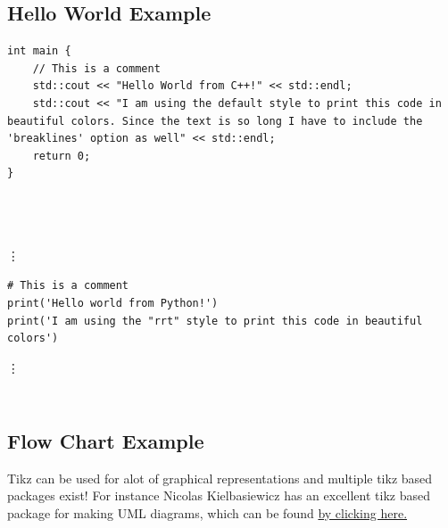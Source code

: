 \subsection{Hello World Example}\label{appendix_A}

\begin{verbatim}
int main {
    // This is a comment
    std::cout << "Hello World from C++!" << std::endl;
    std::cout << "I am using the default style to print this code in beautiful colors. Since the text is so long I have to include the 'breaklines' option as well" << std::endl;
    return 0;
}


 
\end{verbatim}

\vdots

\begin{verbatim}
# This is a comment
print('Hello world from Python!')
print('I am using the "rrt" style to print this code in beautiful colors')
\end{verbatim}

\vdots

\inputminted[breaklines]{Python}{./Code/main.py}


\inputminted[breaklines]{Matlab}{./Code/HelloWorld.m}

\newpage
\subsection{Flow Chart Example}

Tikz can be used for alot of graphical representations and multiple tikz based packages exist! For instance Nicolas Kielbasiewicz has an excellent tikz based package for making UML diagrams, which can be found \href{https://perso.ensta-paris.fr/~kielbasi/tikzuml/var/files/doc/tikzumlmanual.pdf}{by clicking here.}

\begin{center}
\end{center}


